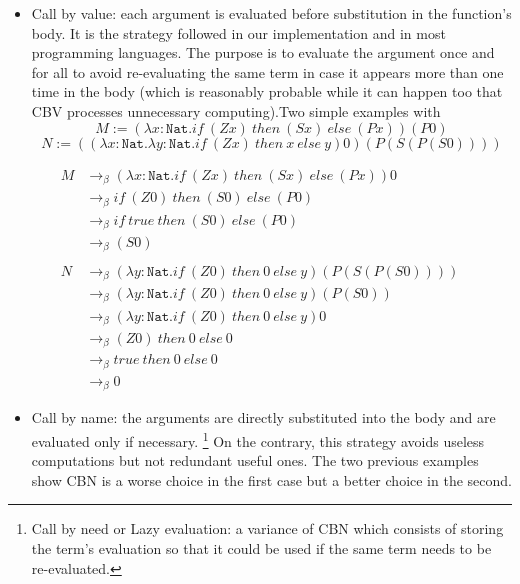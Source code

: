 \documentclass{article}
\begin{document}
    \begin{itemize}
        \item Call by value: each argument is evaluated before substitution in the function's body. It is the strategy followed in our implementation and in most programming languages. The purpose is to evaluate the argument once and for all to avoid re-evaluating the same term in case it appears more than one time in the body (which is reasonably probable while it can happen too that CBV processes unnecessary computing).Two simple examples with 
        $$M :=  (\lambda x : \texttt{Nat}.if \ (Z x) \ then \ (S x) \ else \ (P x)) (P 0)$$
        $$N := ((\lambda x : \texttt{Nat}.\lambda y : \texttt{Nat}.if \ (Z x) \ then \ x \ else \ y ) 0) (P (S (P (S 0))))$$
    \end{itemize}
    \begin{align*}
            M &\rightarrow_\beta
            (\lambda x : \texttt{Nat}.if \ (Z x) \ then \ (S x) \ else \ (P x)) 0\\ &\rightarrow_\beta
            if \ (Z 0) \ then \ (S 0) \ else \ (P 0)\\ &\rightarrow_\beta
            if \ true \ then \ (S 0) \ else \ (P 0)\\ &\rightarrow_\beta
            (S 0)\\\\
            N &\rightarrow_\beta
           (\lambda y : \texttt{Nat}.if \ (Z 0) \ then \ 0 \ else \ y ) (P (S (P (S 0))))\\ &\rightarrow_\beta
           (\lambda y : \texttt{Nat}.if \ (Z 0) \ then \ 0 \ else \ y ) (P (S 0))\\ &\rightarrow_\beta
           (\lambda y : \texttt{Nat}.if \ (Z 0) \ then \ 0 \ else \ y ) 0\\ &\rightarrow_\beta
           (Z 0) \ then \ 0 \ else \ 0\\ &\rightarrow_\beta
           true \ then \ 0 \ else \ 0\\ &\rightarrow_\beta
           0
        \end{align*}
     \begin{itemize}
         \item Call by name: the arguments are directly substituted into the body and are evaluated only if necessary.
         \footnote{Call by need or Lazy evaluation: a variance of CBN which consists of storing the term's evaluation so that it could be used if the same term needs to be re-evaluated.}
         On the contrary, this strategy avoids useless computations but not redundant useful ones. The two previous examples show CBN is a worse choice in the first case but a better choice in the second.
     \end{itemize}
\end{document}
